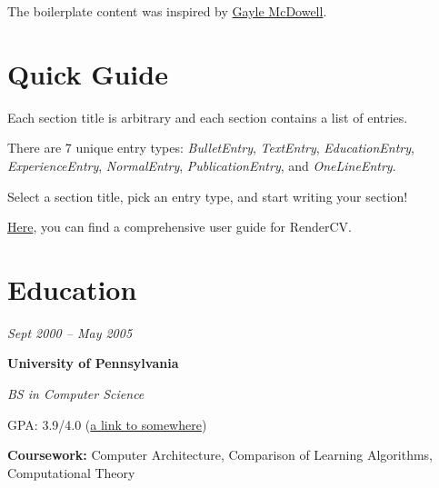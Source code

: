 \documentclass[10pt, letterpaper]{article}
\begin{document}
        \vspace{0.2 cm}

        \begin{onecolentry}
            The boilerplate content was inspired by \href{https://github.com/dnl-blkv/mcdowell-cv}{Gayle McDowell}.
        \end{onecolentry}


    
    \section{Quick Guide}

    \begin{onecolentry}
        \begin{highlightsforbulletentries}


        \item Each section title is arbitrary and each section contains a list of entries.

        \item There are 7 unique entry types: \textit{BulletEntry}, \textit{TextEntry}, \textit{EducationEntry}, \textit{ExperienceEntry}, \textit{NormalEntry}, \textit{PublicationEntry}, and \textit{OneLineEntry}.

        \item Select a section title, pick an entry type, and start writing your section!

        \item \href{https://docs.rendercv.com/user_guide/}{Here}, you can find a comprehensive user guide for RenderCV.


        \end{highlightsforbulletentries}
    \end{onecolentry}

    \section{Education}



        
        \begin{twocolentry}{
            
            
        \textit{Sept 2000 – May 2005}}
            \textbf{University of Pennsylvania}

            \textit{BS in Computer Science}
        \end{twocolentry}

        \vspace{0.10 cm}
        \begin{onecolentry}
            \begin{highlights}
                \item GPA: 3.9/4.0 (\href{https://example.com}{a link to somewhere})
                \item \textbf{Coursework:} Computer Architecture, Comparison of Learning Algorithms, Computational Theory
            \end{highlights}
        \end{onecolentry}
\end{document}
